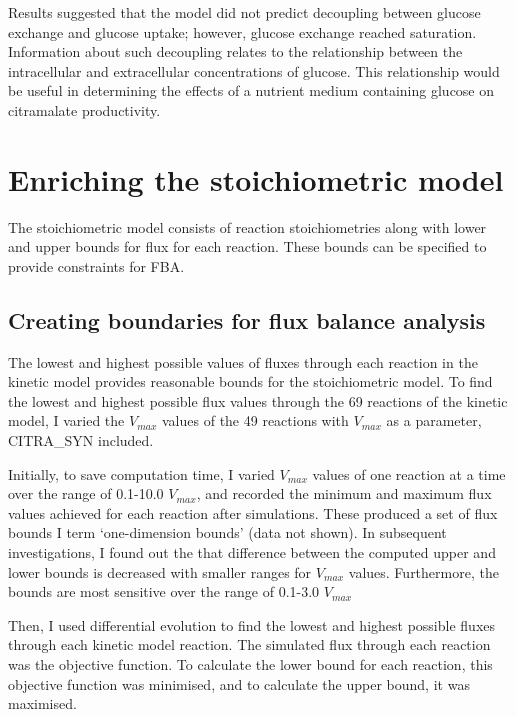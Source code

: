 \documentclass[parskip=full, numbers=noenddot]{scrreprt}
\begin{document}
Results suggested that the model did not predict decoupling between glucose exchange and glucose uptake; however, glucose exchange reached saturation.
Information about such decoupling relates to the relationship between the intracellular and extracellular concentrations of glucose. This relationship would be useful in determining the effects of a nutrient medium containing glucose on citramalate productivity.

\chapter{Enriching the stoichiometric model}
\label{ch:stoich}

The stoichiometric model consists of reaction stoichiometries along with lower and upper bounds for flux for each reaction. These bounds can be specified to provide constraints for FBA.%
\section{Creating boundaries for flux balance analysis}
\label{sec:bounds}

The lowest and highest possible values of fluxes through each reaction in the kinetic model provides reasonable bounds for the stoichiometric model.
To find the lowest and highest possible flux values through the 69 reactions of the kinetic model, I varied the $V_{max}$ values of the 49 reactions with $V_{max}$ as a parameter, CITRA\_SYN included.

Initially, to save computation time, I varied $V_{max}$ values of one reaction at a time over the range of 0.1-10.0 $V_{max}$, and recorded the minimum and maximum flux values achieved for each reaction after simulations. These produced a set of flux bounds I term `one-dimension bounds' (data not shown).
In subsequent investigations, I found out the that difference between the computed upper and lower bounds is decreased with smaller ranges for $V_{max}$ values. Furthermore, the bounds are most sensitive over the range of 0.1-3.0 $V_{max}$

Then, I used differential evolution to find the lowest and highest possible fluxes through each kinetic model reaction. The simulated flux through each reaction was the objective function. To calculate the lower bound for each reaction, this objective function was minimised, and to calculate the upper bound, it was maximised.
\end{document}
